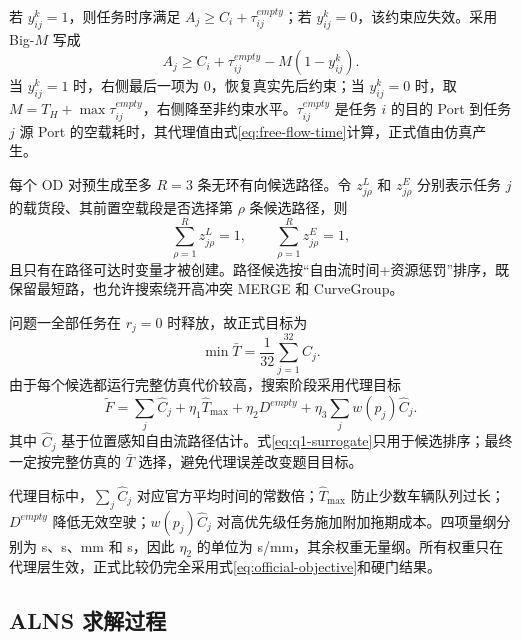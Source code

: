 \documentclass[UTF8]{ctexart}
\begin{document}
若 $y_{ij}^{k}=1$，则任务时序满足 $A_j\ge C_i+\tau_{ij}^{empty}$；若 $y_{ij}^{k}=0$，该约束应失效。采用 Big-$M$ 写成
\begin{equation}\label{eq:bigm-sequence}
A_j\ge C_i+\tau_{ij}^{empty}-M(1-y_{ij}^{k}).
\end{equation}
当 $y_{ij}^{k}=1$ 时，右侧最后一项为 0，恢复真实先后约束；当 $y_{ij}^{k}=0$ 时，取 $M=T_H+\max\tau_{ij}^{empty}$，右侧降至非约束水平。$\tau_{ij}^{empty}$ 是任务 $i$ 的目的 Port 到任务 $j$ 源 Port 的空载耗时，其代理值由式\eqref{eq:free-flow-time}计算，正式值由仿真产生。

每个 OD 对预生成至多 $R=3$ 条无环有向候选路径。令 $z_{j\rho}^{L}$ 和 $z_{j\rho}^{E}$ 分别表示任务 $j$ 的载货段、其前置空载段是否选择第 $\rho$ 条候选路径，则
\begin{equation}\label{eq:path-choice}
\sum_{\rho=1}^{R}z_{j\rho}^{L}=1,\qquad
\sum_{\rho=1}^{R}z_{j\rho}^{E}=1,
\end{equation}
且只有在路径可达时变量才被创建。路径候选按“自由流时间+资源惩罚”排序，既保留最短路，也允许搜索绕开高冲突 MERGE 和 CurveGroup。

问题一全部任务在 $r_j=0$ 时释放，故正式目标为
\begin{equation}
\min \bar T=\frac1{32}\sum_{j=1}^{32}C_j.
\end{equation}
由于每个候选都运行完整仿真代价较高，搜索阶段采用代理目标
\begin{equation}\label{eq:q1-surrogate}
\widetilde F=\sum_j\widehat C_j+\eta_1\widehat T_{\max}+\eta_2D^{empty}+\eta_3\sum_j w(p_j)\widehat C_j.
\end{equation}
其中 $\widehat C_j$ 基于位置感知自由流路径估计。式\eqref{eq:q1-surrogate}只用于候选排序；最终一定按完整仿真的 $\bar T$ 选择，避免代理误差改变题目目标。

代理目标中，$\sum_j\widehat C_j$ 对应官方平均时间的常数倍；$\widehat T_{\max}$ 防止少数车辆队列过长；$D^{empty}$ 降低无效空驶；$w(p_j)\widehat C_j$ 对高优先级任务施加附加拖期成本。四项量纲分别为 s、s、mm 和 s，因此 $\eta_2$ 的单位为 s/mm，其余权重无量纲。所有权重只在代理层生效，正式比较仍完全采用式\eqref{eq:official-objective}和硬门结果。

\subsection{ALNS 求解过程}
\end{document}
